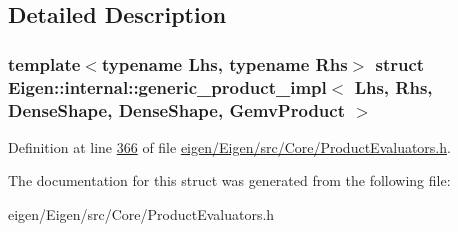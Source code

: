\subsection{Detailed Description}
\subsubsection*{template$<$typename Lhs, typename Rhs$>$\newline
struct Eigen\+::internal\+::generic\+\_\+product\+\_\+impl$<$ Lhs, Rhs, Dense\+Shape, Dense\+Shape, Gemv\+Product $>$}



Definition at line \hyperlink{eigen_2_eigen_2src_2_core_2_product_evaluators_8h_source_l00366}{366} of file \hyperlink{eigen_2_eigen_2src_2_core_2_product_evaluators_8h_source}{eigen/\+Eigen/src/\+Core/\+Product\+Evaluators.\+h}.



The documentation for this struct was generated from the following file\+:\begin{DoxyCompactItemize}
\item 
eigen/\+Eigen/src/\+Core/\+Product\+Evaluators.\+h\end{DoxyCompactItemize}
